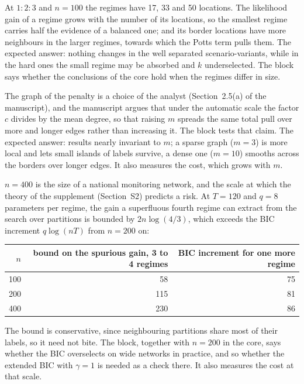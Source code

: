 \documentclass[11pt]{article}
\begin{document}
\begin{description}[leftmargin=1.5em]
  \item[Balance.] At $1:2:3$ and $n = 100$ the regimes have 17, 33 and 50 locations. The likelihood gain of a regime grows with the number of its locations, so the smallest regime carries half the evidence of a balanced one; and its border locations have more neighbours in the larger regimes, towards which the Potts term pulls them. The expected answer: nothing changes in the well separated scenario-variants, while in the hard ones the small regime may be absorbed and $k$ underselected. The block says whether the conclusions of the core hold when the regimes differ in size.
  \item[Graph.] The graph of the penalty is a choice of the analyst (Section~2.5(a) of the manuscript), and the manuscript argues that under the automatic scale the factor $c$ divides by the mean degree, so that raising $m$ spreads the same total pull over more and longer edges rather than increasing it. The block tests that claim. The expected answer: results nearly invariant to $m$; a sparse graph ($m = 3$) is more local and lets small islands of labels survive, a dense one ($m = 10$) smooths across the borders over longer edges. It also measures the cost, which grows with $m$.
  \item[National scale.] $n = 400$ is the size of a national monitoring network, and the scale at which the theory of the supplement (Section~S2) predicts a risk. At $T = 120$ and $q = 8$ parameters per regime, the gain a superfluous fourth regime can extract from the search over partitions is bounded by $2n\log(4/3)$, which exceeds the BIC increment $q\log(nT)$ from $n = 200$ on:
\begin{center}
\begin{tabular}{rrr}
\toprule
$n$ & bound on the spurious gain, 3 to 4 regimes & BIC increment for one more regime \\
\midrule
100 & 58 & 75 \\
200 & 115 & 81 \\
400 & 230 & 86 \\
\bottomrule
\end{tabular}
\end{center}
  The bound is conservative, since neighbouring partitions share most of their labels, so it need not bite. The block, together with $n = 200$ in the core, says whether the BIC overselects on wide networks in practice, and so whether the extended BIC with $\gamma = 1$ is needed as a check there. It also measures the cost at that scale.
\end{description}
\end{document}
